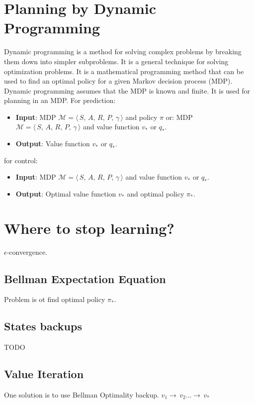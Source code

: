 \section{Planning by Dynamic Programming}\label{sec:planning-by-dynamic-programming}
Dynamic programming is a method for solving complex problems by breaking them down into simpler subproblems.
It is a general technique for solving optimization problems.
It is a mathematical programming method that can be used to find an optimal policy for a given Markov decision process (MDP).
Dynamic programming assumes that the MDP is known and finite.
It is used for planning in an MDP.
For prediction:
\begin{itemize}
    \item \textbf{Input}: MDP $\mathcal{M} = \langle\,S,\,A,\,R,\,P,\,\gamma\,\rangle$ and policy $\pi$
    or: MDP $\mathcal{M} = \langle\,S,\,A,\,R,\,P,\,\gamma\,\rangle$ and value function $v_*$ or $q_*$.
    \item \textbf{Output}: Value function $v_*$ or $q_*$.
\end{itemize}

for control:
\begin{itemize}
    \item \textbf{Input}: MDP $\mathcal{M} = \langle\,S,\,A,\,R,\,P,\,\gamma\,\rangle$ and value function $v_*$ or $q_*$.
    \item \textbf{Output}: Optimal value function $v_*$ and optimal policy $\pi_*$.
\end{itemize}


\section{Where to stop learning?}\label{sec:where-to-stop-learning}
$\epsilon$-convergence.

\subsection{Bellman Expectation Equation}\label{sec:bellman-expectation-equation} %
Problem is ot find optimal policy $\pi_*$.

\subsection{States backups}
TODO

\subsection{Value Iteration}\label{sec:value-iteration}
One solution is to use Bellman Optimality backup.
$v_1\rightarrow\,v_2\ldots\rightarrow\,v_*$


